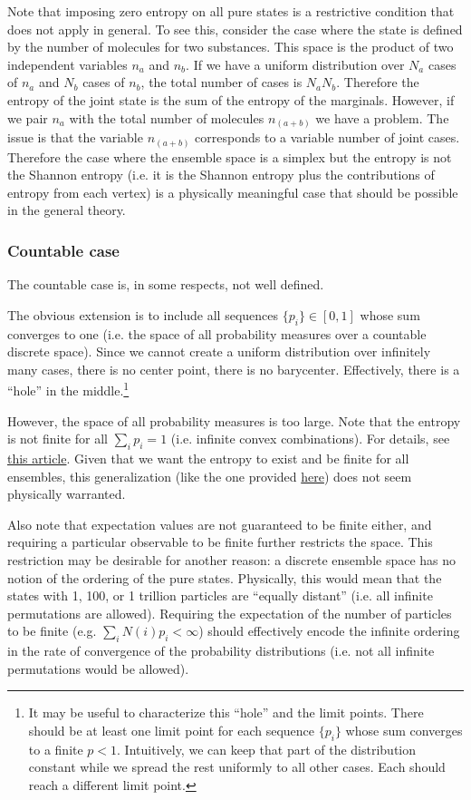 Note that imposing zero entropy on all pure states is a restrictive condition that does not apply in general. To see this, consider the case where the state is defined by the number of molecules for two substances. This space is the product of two independent variables $n_a$ and $n_b$. If we have a uniform distribution over $N_a$ cases of $n_a$ and $N_b$ cases of $n_b$, the total number of cases is $N_a N_b$. Therefore the entropy of the joint state is the sum of the entropy of the marginals. However, if we pair $n_a$ with the total number of molecules $n_{(a+b)}$ we have a problem. The issue is that the variable $n_{(a+b)}$ corresponds to a variable number of joint cases. Therefore the case where the ensemble space is a simplex but the entropy is not the Shannon entropy (i.e. it is the Shannon entropy plus the contributions of entropy from each vertex) is a physically meaningful case that should be possible in the general theory.

\subsubsection{Countable case}

The countable case is, in some respects, not well defined.

The obvious extension is to include all sequences $\{p_i\} \in [0,1]$ whose sum converges to one (i.e. the space of all probability measures over a countable discrete space). Since we cannot create a uniform distribution over infinitely many cases, there is no center point, there is no barycenter. Effectively, there is a ``hole'' in the middle.\footnote{It may be useful to characterize this ``hole'' and the limit points. There should be at least one limit point for each sequence $\{p_i\}$ whose sum converges to a finite $p < 1$. Intuitively, we can keep that part of the distribution constant while we spread the rest uniformly to all other cases. Each should reach a different limit point.}

However, the space of all probability measures is too large. Note that the entropy is not finite for all $\sum_i p_i =1$ (i.e. infinite convex combinations). For details, see \href{https://arxiv.org/pdf/1212.5630.pdf}{this article}. Given that we want the entropy to exist and be finite for all ensembles, this generalization (like the one provided \href{https://ncatlab.org/nlab/show/superconvex+space}{here}) does not seem physically warranted.

Also note that expectation values are not guaranteed to be finite either, and requiring a particular observable to be finite further restricts the space. This restriction may be desirable for another reason: a discrete ensemble space has no notion of the ordering of the pure states. Physically, this would mean that the states with 1, 100, or 1 trillion particles are ``equally distant'' (i.e. all infinite permutations are allowed). Requiring the expectation of the number of particles to be finite (e.g. $\sum_i N(i) p_i < \infty$) should effectively encode the infinite ordering in the rate of convergence of the probability distributions (i.e. not all infinite permutations would be allowed).


